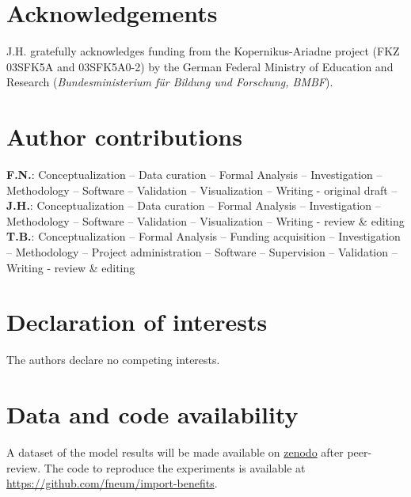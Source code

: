 \documentclass[5p,10pt]{elsarticle}
\renewcommand{\ttdefault}{\sfdefault}
\begin{document}
\section*{Acknowledgements}

J.H. gratefully acknowledges funding from the Kopernikus-Ariadne project (FKZ
03SFK5A and 03SFK5A0-2) by the German Federal Ministry of Education and
Research (\textit{Bundesministerium für Bildung und Forschung, BMBF}).


\section*{Author contributions}


\textbf{F.N.}:
Conceptualization --
Data curation --
Formal Analysis --
Investigation --
Methodology --
Software --
Validation --
Visualization --
Writing - original draft --
\textbf{J.H.}:
Conceptualization --
Data curation --
Formal Analysis --
Investigation --
Methodology --
Software --
Validation --
Visualization --
Writing - review \& editing
\textbf{T.B.}:
Conceptualization --
Formal Analysis --
Funding acquisition --
Investigation --
Methodology --
Project administration --
Software --
Supervision --
Validation --
Writing - review \& editing

\section*{Declaration of interests}

The authors declare no competing interests.

\section*{Data and code availability}

A dataset of the model results will be made available on \url{zenodo} after peer-review.
The code to reproduce the experiments is available at \url{https://github.com/fneum/import-benefits}.

\renewcommand{\ttdefault}{\sfdefault}

\end{document}
